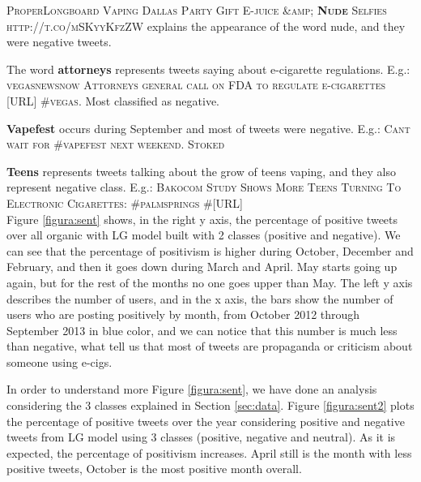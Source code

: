 \documentclass{sig-alternate}
\begin{document}
\textsc{ProperLongboard Vaping Dallas Party Gift E-juice \&amp; \textbf{Nude} Selfies http://t.co/mSKyyKfzZW} explains the appearance of the word nude, and they were negative tweets.

The word \textbf{attorneys} represents tweets saying about e-cigarette regulations. E.g.: \textsc{vegasnewsnow Attorneys general call on FDA to regulate e-cigarettes [URL] \#vegas}. Most classified as negative.

\textbf{Vapefest} occurs during September and most of tweets were negative. E.g.: \textsc{Cant wait for \#vapefest next weekend. Stoked}

\textbf{Teens} represents tweets talking about the grow of teens vaping, and they also represent negative class. E.g.: \textsc{Bakocom Study Shows More Teens Turning To Electronic Cigarettes: \#palmsprings \#[URL]}\\


Figure \ref{figura:sent} shows, in the right y axis, the percentage of positive tweets over all organic with LG model built with 2 classes (positive and negative). We can see that the percentage of positivism is higher during October, December and February, and then it goes down during March and April. May starts going up again, but for the rest of the months no one goes upper than May. The left y axis describes the number of users, and in the x axis, the bars show the number of users who are posting positively by month, from October 2012 through September 2013 in blue color, and we can notice that this number is much less than negative, what tell us that most of tweets are propaganda or criticism about someone using e-cigs. 

In order to understand more Figure \ref{figura:sent}, we have done an analysis considering the 3 classes explained in Section \ref{sec:data}. Figure \ref{figura:sent2} plots the percentage of positive tweets over the year considering positive and negative tweets from LG model using 3 classes (positive, negative and neutral). As it is expected, the percentage of positivism increases. April still is the month with less positive tweets, October is the most positive month overall.
\end{document}
